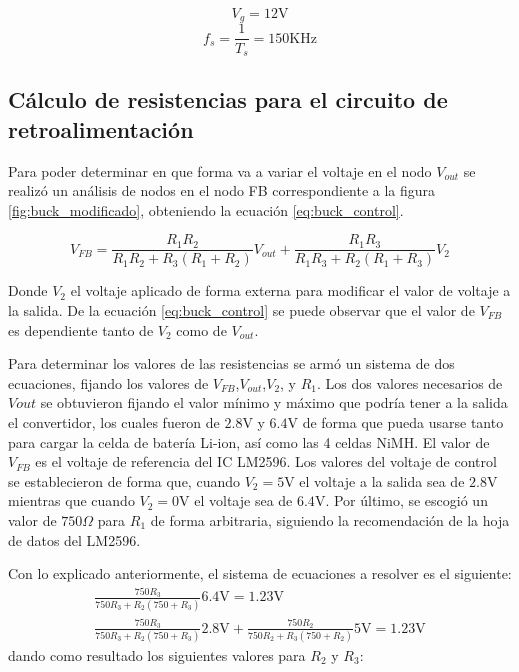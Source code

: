     $$V_g = 12\text{V}$$
    $$ f_s = \frac{1}{T_s} = 150 \text{KHz}$$



    \subsection{Cálculo de resistencias para el circuito de retroalimentación}

    \label{sec:res_ret}

    Para poder determinar en que forma va a variar el voltaje en el nodo $V_{out}$ se realizó un 
    análisis de nodos en el nodo FB correspondiente a la figura \ref*{fig:buck_modificado}, 
    obteniendo la ecuación \ref*{eq:buck_control}.

    \begin{equation}
        V_{FB} = \frac{R_1R_2}{R_1R_2+R_3(R_1+R_2)} V_{out} + \frac{R_1R_3}{R_1R_3+R_2(R_1+R_3)} V_2
        \label{eq:buck_control}
    \end{equation}

    Donde $V_2$ el voltaje aplicado de forma externa para modificar el valor
    de voltaje a la salida. De la ecuación \ref*{eq:buck_control} se puede 
    observar que el valor de $V_{FB}$ es dependiente tanto de $V_2$ como de
    $V_{out}$. 

    Para determinar los valores de las resistencias se armó un sistema de dos ecuaciones,
    fijando los valores de $V_{FB}$,$V_{out}$,$V_2$, y $R_1$. Los dos valores necesarios
    de $V{out}$ se obtuvieron fijando el valor mínimo y máximo que podría tener a la salida
    el convertidor, los cuales fueron de $2.8\text{V}$ y $6.4\text{V}$ de forma que pueda usarse tanto para 
    cargar la celda de batería Li-ion, así como las 4 celdas NiMH. El valor de $V_{FB}$ 
    es el voltaje de referencia del IC LM2596. Los valores del voltaje de control se
    establecieron de forma que, cuando $V_2 = 5\text{V}$ el voltaje a la salida sea de 
    $2.8\text{V}$ mientras que cuando  $V_2 = 0\text{V}$ el voltaje sea de $6.4\text{V}$.
    Por último, se escogió un valor de $750\Omega$ para $R_1$ de forma arbitraria, siguiendo
    la recomendación de la hoja de datos del LM2596.

    Con lo explicado anteriormente, el sistema de ecuaciones a resolver es el siguiente:
    \begin{eqnarray}
        \frac{750R_3}{ 750R_3 + R_2(750 + R_3)} 6.4\text{V} = 1.23\text{V} \\
        \frac{750R_3}{ 750R_3 + R_2(750 + R_3)} 2.8\text{V} + \frac{750R_2}{750R_2+R_3(750+R_2)} 5\text{V} = 1.23\text{V}   
    \end{eqnarray}
    dando como resultado los siguientes valores para $R_2$ y $R_3$:

